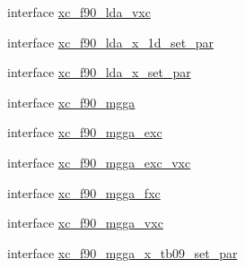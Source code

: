 \begin{DoxyCompactItemize}
interface \hyperlink{interfacexc__f90__lib__m_1_1xc__f90__lda__vxc}{xc\-\_\-f90\-\_\-lda\-\_\-vxc}
\item 
interface \hyperlink{interfacexc__f90__lib__m_1_1xc__f90__lda__x__1d__set__par}{xc\-\_\-f90\-\_\-lda\-\_\-x\-\_\-1d\-\_\-set\-\_\-par}
\item 
interface \hyperlink{interfacexc__f90__lib__m_1_1xc__f90__lda__x__set__par}{xc\-\_\-f90\-\_\-lda\-\_\-x\-\_\-set\-\_\-par}
\item 
interface \hyperlink{interfacexc__f90__lib__m_1_1xc__f90__mgga}{xc\-\_\-f90\-\_\-mgga}
\item 
interface \hyperlink{interfacexc__f90__lib__m_1_1xc__f90__mgga__exc}{xc\-\_\-f90\-\_\-mgga\-\_\-exc}
\item 
interface \hyperlink{interfacexc__f90__lib__m_1_1xc__f90__mgga__exc__vxc}{xc\-\_\-f90\-\_\-mgga\-\_\-exc\-\_\-vxc}
\item 
interface \hyperlink{interfacexc__f90__lib__m_1_1xc__f90__mgga__fxc}{xc\-\_\-f90\-\_\-mgga\-\_\-fxc}
\item 
interface \hyperlink{interfacexc__f90__lib__m_1_1xc__f90__mgga__vxc}{xc\-\_\-f90\-\_\-mgga\-\_\-vxc}
\item 
interface \hyperlink{interfacexc__f90__lib__m_1_1xc__f90__mgga__x__tb09__set__par}{xc\-\_\-f90\-\_\-mgga\-\_\-x\-\_\-tb09\-\_\-set\-\_\-par}
\end{DoxyCompactItemize}
